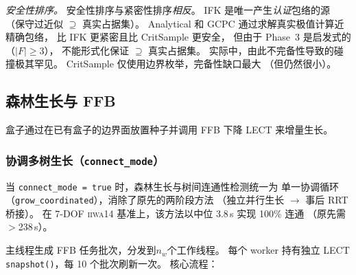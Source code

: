 \documentclass[journal]{IEEEtran}
\begin{document}
\emph{安全性排序。}
安全性排序与紧密性排序\emph{相反}。
IFK 是唯一产生\emph{认证}包络的源
（保守过近似 $\supseteq$ 真实占据集）。
Analytical 和 GCPC 通过求解真实极值计算近精确包络，
比 IFK 更紧密且比 CritSample 更安全，
但由于 Phase~3 是启发式的（$|F| \geq 3$），
不能形式化保证 $\supseteq$ 真实占据集。
实际中，由此不完备性导致的碰撞极其罕见。
CritSample 仅使用边界枚举，完备性缺口最大
（但仍然很小）。

\subsection{森林生长与 FFB}\label{sec:forest_growth}

盒子通过在已有盒子的边界面放置种子并调用 FFB 下降 LECT 来增量生长。

\subsubsection{协调多树生长（\texttt{connect\_mode}）}

当 \texttt{connect\_mode = true} 时，森林生长与树间连通性检测统一为
单一协调循环（\texttt{grow\_coordinated}），消除了原先的两阶段方法
（独立并行生长 $\to$ 事后 RRT 桥接）。
在 7-DOF \textsc{iiwa14} 基准上，该方法以中位 3.8\,s 实现 100\% 连通
（原先需 $>$238\,s）。

主线程生成 FFB 任务批次，分发到$n_w$个工作线程。
每个 worker 持有独立 LECT \texttt{snapshot()}，每 10 个批次刷新一次。
核心流程：
\end{document}
